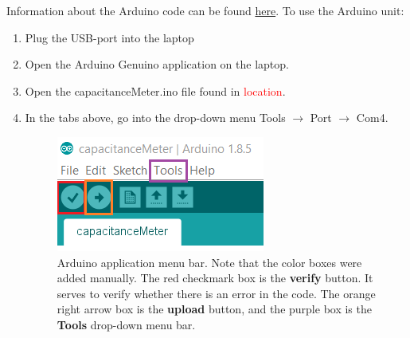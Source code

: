 \documentclass[12pt]{report}
\def \todo #1{\textcolor{red}{#1}}
\begin{document}
\noindent Information about the Arduino code can be found \href{https://www.arduino.cc/en/Tutorial/CapacitanceMeter}{here}. To use the Arduino unit:
\begin{enumerate}
\item Plug the USB-port into the laptop
\item Open the Arduino Genuino application on the laptop.
\item Open the capacitanceMeter.ino file found in \todo{location}.

\item In the tabs above, go into the drop-down menu Tools $\rightarrow$ Port $\rightarrow$ Com4.
\begin{figure}[H]
\centering
\includegraphics[width=0.5 \textwidth]{lab1-Arduino-menu-bar.png}
\caption{Arduino application menu bar. Note that the color boxes were added manually. The red checkmark box is the \textbf{verify} button. It serves to verify whether there is an error in the code. The orange right arrow box is the \textbf{upload} button, and the purple box is the \textbf{Tools} drop-down menu bar.}
\label{Fig:ArduinoMenuBar}
\end{figure}


\end{enumerate}
\end{document}
